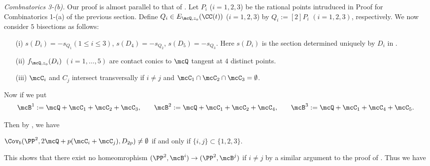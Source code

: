 % 





{\sl  Combnatorics 3-(b).} Our proof is almost parallel to that of \cite[Thoerem 1]{bannai-tokunaga}.
Let $P_i$ ($i = 1, 2, 3$) be the rational points intruduced
in Proof for Combinatorics 1-(a) of  the previous section. Define $Q_i \in E_{\mcQ, z_o}(\CC(t))$ 
($i = 1, 2, 3$) by $Q_i := [2]P_i$ $(i = 1, 2, 3)$, respectively. We now consider $5$ bisections as
follows:

\begin{enumerate}      
\item[(i)]  $s(D_i) = - s_{Q_1} (1 \le i \le 3)$, $s(D_4) = - s_{Q_2}$, 
$s(D_5) = -s_{Q_3}$. Here $s(D_i)$ is the section determined uniquely by $D_i$ in \cite[Lemma~5.1]{shioda90}. 
\item[(ii)] $f_{\mcQ, z_o}(D_i)$ $(i =1,\ldots, 5)$  are contact conics to $\mcQ$ tangent at
$4$ distinct points.

\item[(iii)]  $\mcC_i$ and $C_j$ intersect transversally if $i \neq j$ and $\mcC_1\cap \mcC_2 \cap \mcC_3 = \emptyset$.
\end{enumerate}

Now if we put
\[
\begin{array}{ccccc}
\mcB^1  :=  \mcQ + \mcC_1 + \mcC_2 + \mcC_3,  & &
\mcB^2  :=   \mcQ + \mcC_1 + \mcC_2  + \mcC_4,  & &
\mcB^3 : =  \mcQ + \mcC_1 + \mcC_4 + \mcC_5. 
\end{array}
\]

Then by \cite[Theorem~4]{bannai-tokunaga}, we have

\begin{prop}\label{prop:key2}{
 $\Cov_b(\PP^2, 2\mcQ + p(\mcC_i + \mcC_j), D_{2p}) \neq \emptyset$ if and only if $\{i, j\} \subset \{1, 2, 3\}$.
}
\end{prop}

This shows that there exist no homeomrophism $(\PP^2, \mcB^i) \to (\PP^2, \mcB^j)$ if 
$i \neq j$ by a similar argument to the proof of \cite[Proposition~3]{bannai-tokunaga}. Thus we have

